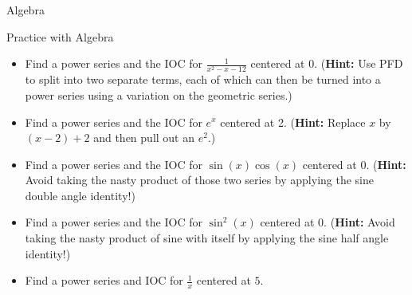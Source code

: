 \begin{subsection}{Algebra}
\begin{exercise}{Practice with Algebra \Coffeecup \Coffeecup \Coffeecup}
\begin{itemize}
\item Find a power series and the IOC for $\frac{1}{x^2-x-12}$ centered at 0. ({\bf Hint:} Use PFD to split into two separate terms, each of which can then be turned into a power series using a variation on the geometric series.)

\vspace*{2in}

\item Find a power series and the IOC for $e^x$ centered at 2. ({\bf Hint:}  Replace $x$ by $(x-2)+2$ and then pull out an $e^2$.)

\vspace*{2in}

\item Find a power series and the IOC for $\sin(x)\cos(x)$ centered at 0. ({\bf Hint:} Avoid taking the nasty product of those two series by applying the sine double angle identity!)

\vspace*{2in}

\item Find a power series and the IOC for $\sin^2(x)$ centered at 0. ({\bf Hint:} Avoid taking the nasty product of sine with itself by applying the sine half angle identity!)

\vspace*{2in}
\item Find a power series and IOC for $\frac{1}{x}$ centered at $5$.

\vspace*{2in}
\end{itemize}
\end{exercise}
\end{subsection}

